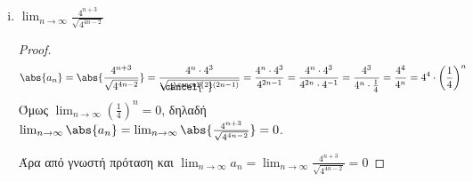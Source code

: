 \begin{enumerate}
\begin{enumerate}[i)]
      \item $ \lim_{n \to \infty} \frac{4^{n+3}}{\sqrt{4^{4n-2}}} $ 
        \begin{proof}
          \[
            \abs{a_{n}} = \abs{\frac{4^{n+3}}{\sqrt{4^{4n-2}}}} = 
            \frac{4^{n}\cdot 
            4^{3}}{\rlap{\cancel{\phantom{--}}}{\sqrt{4^{\cancel{2}(2n-1)}}}} = 
            \frac{4^{n} \cdot 4^{3}}{4^{2n-1}} = 
            \frac{4^{n}\cdot 4^{3}}{4^{2n}\cdot 4^{-1}} = 
            \frac{4^{3}}{4^{n}\cdot 
            \frac{1}{4}} = \frac{4^{4}}{4^{n}} = 4^{4}\cdot 
            \left(\frac{1}{4} \right) ^{n}
          \] 
          Όμως $ \lim_{n \to \infty} \left(\frac{1}{4}\right)^{n} = 0  $, 
          δηλαδή $ \lim_{n \to \infty} \abs{a_{n}} = \lim_{n \to \infty}
          \abs{\frac{4^{n+3}}{\sqrt{4^{4n-2}}}} = 0 $. 

          Άρα από γνωστή πρόταση και
          $ \lim_{n \to \infty} a_{n} =  \lim_{n \to \infty} 
          \frac{4^{n+3}}{\sqrt{4^{4n-2}}} = 0 $ 
        \end{proof}
    \end{enumerate}
\end{enumerate}




